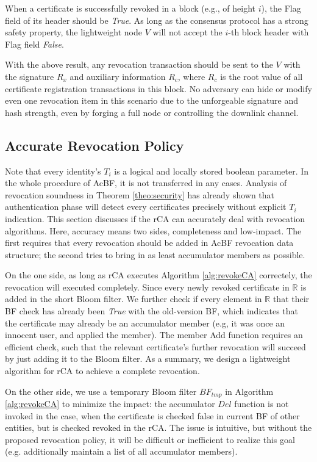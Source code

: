 \documentclass[conference]{IEEEtran}
\begin{document}
\begin{IEEEproof}
When a certificate is successfully revoked in a block (e.g., of height $i$), the Flag field of its header should be \textit{True}. As long as the consensus protocol has a strong safety property, the lightweight node $V$ will not accept the $i$-th block header with Flag field \textit{False}. 

With the above result, any revocation transaction should be sent to the $V$ with the signature $R_x$ and auxiliary information $R_c$, where $R_c$ is the root value of all certificate registration transactions in this block. No adversary can hide or modify even one revocation item in this scenario due to the unforgeable signature and hash strength, even by forging a full node or controlling the downlink channel.
\end{IEEEproof}


\subsection{Accurate Revocation Policy}

Note that every identity's $T_i$ is a logical and locally stored boolean parameter. In the whole procedure of AcBF, it is not transferred in any cases. Analysis of revocation soundness in Theorem \ref{theo:security} has already shown that authentication phase will detect every certificates precisely without explicit $T_i$ indication. This section discusses if the rCA can accurately deal with revocation algorithms. Here, accuracy means two sides, completeness and low-impact. The first requires that every revocation should be added in AcBF revocation data structure; the second tries to bring in as least accumulator members as possible. 

On the one side, as long as rCA executes Algorithm \ref{alg:revokeCA} correctely, the revocation will executed completely. Since every newly revoked certificate in $\mathbb{R}$ is added in the short Bloom filter. We further check if every element in  $\mathbb{R}$ that their BF check has already been \textit{True} with the old-version BF, which indicates that the certificate may already be an accumulator member (e.g, it was once an innocent user, and applied the member). The member Add function requires an efficient check, such that the relevant certificate's further revocation will succeed by just adding it to the Bloom filter. As a summary, we design a lightweight algorithm for rCA to achieve a complete revocation.

On the other side, we use a temporary Bloom filter $BF_{tmp}$ in Algorithm \ref{alg:revokeCA} to minimize the impact: the accumulator $Del$ function is not invoked in the case, when the certificate is checked false in current BF of other entities, but is checked revoked in the rCA. The issue is intuitive, but without the proposed revocation policy, it will be difficult or inefficient to realize this goal (e.g. additionally maintain a list of all accumulator members).
\end{document}
